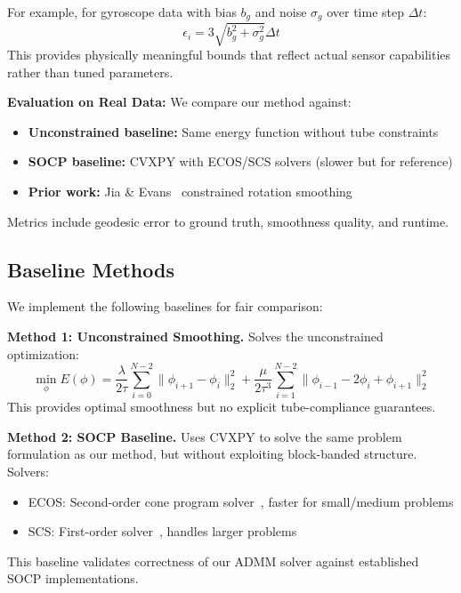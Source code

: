 For example, for gyroscope data with bias $b_g$ and noise $\sigma_g$ over time step $\Delta t$:
\begin{equation}
\epsilon_i = 3\sqrt{b_g^2 + \sigma_g^2} \Delta t
\end{equation}
This provides physically meaningful bounds that reflect actual sensor capabilities rather than tuned parameters.

\textbf{Evaluation on Real Data:} We compare our method against:
\begin{itemize}
\item \textbf{Unconstrained baseline:} Same energy function without tube constraints
\item \textbf{SOCP baseline:} CVXPY with ECOS/SCS solvers (slower but for reference)
\item \textbf{Prior work:} Jia & Evans~\cite{jia_evans} constrained rotation smoothing
\end{itemize}

Metrics include geodesic error to ground truth, smoothness quality, and runtime.

\subsection{Baseline Methods}

We implement the following baselines for fair comparison:

\textbf{Method 1: Unconstrained Smoothing.} Solves the unconstrained optimization:
\begin{equation}
\min_\phi E(\phi) = \frac{\lambda}{2\tau}\sum_{i=0}^{N-2} \|\phi_{i+1} - \phi_i\|_2^2 + \frac{\mu}{2\tau^3}\sum_{i=1}^{N-2} \|\phi_{i-1} - 2\phi_i + \phi_{i+1}\|_2^2
\end{equation}
This provides optimal smoothness but no explicit tube-compliance guarantees.

\textbf{Method 2: SOCP Baseline.} Uses CVXPY to solve the same problem formulation as our method, but without exploiting block-banded structure. Solvers:
\begin{itemize}
\item ECOS: Second-order cone program solver~\cite{boyd_scp}, faster for small/medium problems
\item SCS: First-order solver~\cite{boyd_scp}, handles larger problems
\end{itemize}

This baseline validates correctness of our ADMM solver against established SOCP implementations.

